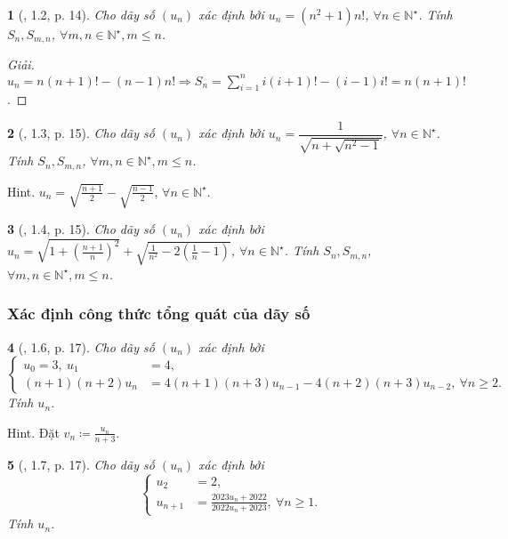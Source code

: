 \documentclass{article}
\newtheorem{baitoan}{}
\begin{document}
\begin{baitoan}[\cite{Quoc_Long_Dat_Nam_VMC}, 1.2, p. 14]
	Cho dãy số $(u_n)$ xác định bởi $u_n = (n^2 + 1)n!$, $\forall n\in\mathbb{N}^\star$. Tính $S_n,S_{m,n}$, $\forall m,n\in\mathbb{N}^\star,m\le n$.
\end{baitoan}

\begin{proof}[Giải]
	$u_n = n(n + 1)! - (n - 1)n!\Rightarrow S_n = \sum_{i=1}^n i(i + 1)! - (i - 1)i! = n(n + 1)!$.
\end{proof}

\begin{baitoan}[\cite{Quoc_Long_Dat_Nam_VMC}, 1.3, p. 15]
	Cho dãy số $(u_n)$ xác định bởi $u_n = \dfrac{1}{\sqrt{n + \sqrt{n^2 - 1}}}$, $\forall n\in\mathbb{N}^\star$. Tính $S_n,S_{m,n}$, $\forall m,n\in\mathbb{N}^\star,m\le n$.
\end{baitoan}
{\sf Hint.} $u_n = \sqrt{\frac{n + 1}{2}} - \sqrt{\frac{n - 1}{2}}$, $\forall n\in\mathbb{N}^\star$.

\begin{baitoan}[\cite{Quoc_Long_Dat_Nam_VMC}, 1.4, p. 15]
	Cho dãy số $(u_n)$ xác định bởi $u_n = \sqrt{1 + \left(\frac{n + 1}{n}\right)^2} + \sqrt{\frac{1}{n^2} - 2\left(\frac{1}{n} - 1\right)}$, $\forall n\in\mathbb{N}^\star$. Tính $S_n,S_{m,n}$, $\forall m,n\in\mathbb{N}^\star,m\le n$.
\end{baitoan}

\subsubsection{Xác định công thức tổng quát của dãy số}

\begin{baitoan}[\cite{Quoc_Long_Dat_Nam_VMC}, 1.6, p. 17]
	Cho dãy số $(u_n)$ xác định bởi
	\begin{equation*}
		\left\{\begin{split}
			u_0 = 3,\ u_1 &= 4,\\
			(n + 1)(n + 2)u_n &= 4(n + 1)(n + 3)u_{n-1} - 4(n + 2)(n + 3)u_{n-2},\ \forall n\ge2.
		\end{split}\right.
	\end{equation*}
	Tính $u_n$.
\end{baitoan}
{\sf Hint.} Đặt $v_n\coloneqq\frac{u_n}{n + 3}$.

\begin{baitoan}[\cite{Quoc_Long_Dat_Nam_VMC}, 1.7, p. 17]
	Cho dãy số $(u_n)$ xác định bởi
	\begin{equation*}
		\left\{\begin{split}
			u_2 &= 2,\\
			u_{n+1} &= \frac{2023u_n + 2022}{2022u_n + 2023},\ \forall n\ge1.
		\end{split}\right.
	\end{equation*}
	Tính $u_n$.
\end{baitoan}
\end{document}
